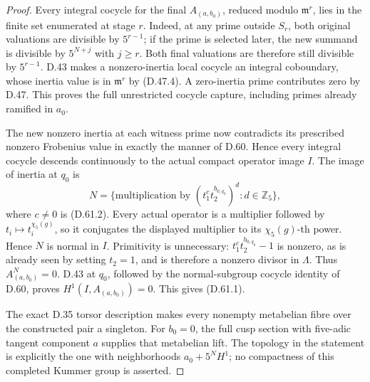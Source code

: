 \begin{proof}
Every integral cocycle for the final \(A_{(a,b_0)}\),
reduced modulo \(\mathfrak m^r\), lies in the finite
set enumerated at stage \(r\). Indeed, at any prime
outside \(S_r\), both original valuations are divisible
by \(5^{r-1}\); if the prime is selected later, the
new summand is divisible by \(5^{N+j}\) with \(j\ge r\).
Both final valuations are therefore still divisible by
\(5^{r-1}\). D.43 makes a nonzero-inertia local
cocycle an integral coboundary, whose inertia value is
in \(\mathfrak m^r\) by (D.47.4). A zero-inertia
prime contributes zero by D.47. This proves the full
unrestricted cocycle capture, including primes already
ramified in \(a_0\).

The new nonzero inertia at each witness prime now
contradicts its prescribed nonzero Frobenius value in
exactly the manner of D.60. Hence every integral cocycle
descends continuously to the actual compact operator
image \(I\). The image of inertia at \(q_0\) is
\[
 N=\{\text{multiplication by }
         (t_1^c t_2^{b_{0,q_0}})^d:d\in\mathbb Z_5\},
                                                        \tag{D.61.7}
\]
where \(c\ne0\) is (D.61.2). Every actual operator is
a multiplier followed by \(t_i\mapsto t_i^{\chi_5(g)}\),
so it conjugates the displayed multiplier to its
\(\chi_5(g)\)-th power. Hence \(N\) is normal in \(I\).
Primitivity is unnecessary: \(t_1^c t_2^{b_{0,q_0}}-1\)
is nonzero, as is already seen by setting \(t_2=1\),
and is therefore a nonzero divisor in \(\Lambda\).
Thus \(A_{(a,b_0)}^N=0\). D.43 at \(q_0\), followed by the
normal-subgroup cocycle identity of D.60, proves
\(H^1(I,A_{(a,b_0)})=0\). This gives (D.61.1).

The exact D.35 torsor description makes every nonempty
metabelian fibre over the constructed pair a singleton.
For \(b_0=0\), the full cusp section with five-adic
tangent component \(a\) supplies that metabelian lift.
The topology in the statement is explicitly the one
with neighborhoods \(a_0+5^N H^1\); no compactness
of this completed Kummer group is asserted.
\end{proof}

